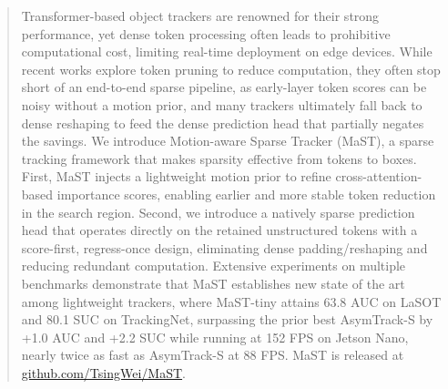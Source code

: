 \begin{abstract}
  Transformer-based object trackers are renowned for their strong performance, yet dense token processing often leads to prohibitive computational cost, limiting real-time deployment on edge devices. While recent works explore token pruning to reduce computation, they often stop short of an end-to-end sparse pipeline, as early-layer token scores can be noisy without a motion prior, and many trackers ultimately fall back to dense reshaping  to feed the dense prediction head that partially negates the savings.
  We introduce Motion-aware Sparse Tracker (MaST), a sparse tracking framework that makes sparsity effective from tokens to boxes. First, MaST injects a lightweight motion prior to refine cross-attention-based importance scores, enabling earlier and more stable token reduction in the search region. Second, we introduce a natively sparse prediction head that operates directly on the retained unstructured tokens with a score-first, regress-once design, eliminating dense padding/reshaping and reducing redundant computation.
  Extensive experiments on multiple benchmarks demonstrate that MaST establishes new state of the art among lightweight trackers, where MaST-tiny attains 63.8 AUC on LaSOT and 80.1 SUC on TrackingNet, surpassing the prior best AsymTrack-S by +1.0 AUC and +2.2 SUC 
  while running at 152 FPS on Jetson Nano, nearly twice as fast as AsymTrack-S at 88 FPS.  MaST is released at \url{github.com/TsingWei/MaST}.
\end{abstract}
